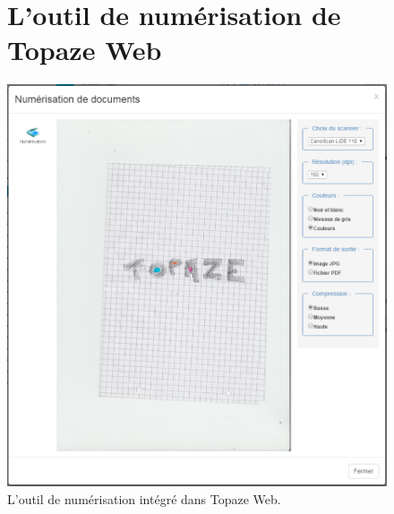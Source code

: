 \begin{appendices}
\newpage
\begin{figure}[H]
	\section*{L'outil de numérisation de Topaze Web}
	\centering
	\includegraphics[width=16cm]{./img/scan}
	\caption{\label{fig:scan} L'outil de numérisation intégré dans Topaze Web.}
\end{figure}


\end{appendices}

